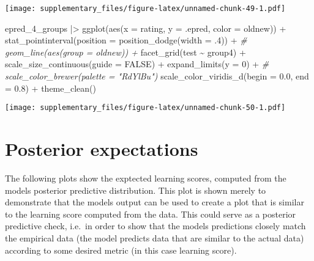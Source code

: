 \documentclass[
  man,floatsintext]{apa7}
\newenvironment{Shaded}{\begin{snugshade}}{\end{snugshade}}
\newcommand{\AttributeTok}[1]{\textcolor[rgb]{0.77,0.63,0.00}{#1}}
\newcommand{\CommentTok}[1]{\textcolor[rgb]{0.56,0.35,0.01}{\textit{#1}}}
\newcommand{\ConstantTok}[1]{\textcolor[rgb]{0.00,0.00,0.00}{#1}}
\newcommand{\DecValTok}[1]{\textcolor[rgb]{0.00,0.00,0.81}{#1}}
\newcommand{\FloatTok}[1]{\textcolor[rgb]{0.00,0.00,0.81}{#1}}
\newcommand{\FunctionTok}[1]{\textcolor[rgb]{0.00,0.00,0.00}{#1}}
\newcommand{\NormalTok}[1]{#1}
\newcommand{\SpecialCharTok}[1]{\textcolor[rgb]{0.00,0.00,0.00}{#1}}
\begin{document}
\texttt{[image: supplementary\_files/figure-latex/unnamed-chunk-49-1.pdf]}

\begin{Shaded}
\begin{Highlighting}[]
\NormalTok{epred\_4\_groups }\SpecialCharTok{|\textgreater{}}
  \FunctionTok{ggplot}\NormalTok{(}\FunctionTok{aes}\NormalTok{(}\AttributeTok{x =}\NormalTok{ rating, }\AttributeTok{y =}\NormalTok{ .epred, }\AttributeTok{color =}\NormalTok{ oldnew)) }\SpecialCharTok{+}
  \FunctionTok{stat\_pointinterval}\NormalTok{(}\AttributeTok{position =} \FunctionTok{position\_dodge}\NormalTok{(}\AttributeTok{width =}\NormalTok{ .}\DecValTok{4}\NormalTok{)) }\SpecialCharTok{+}
  \CommentTok{\# geom\_line(aes(group = oldnew)) +}
  \FunctionTok{facet\_grid}\NormalTok{(test }\SpecialCharTok{\textasciitilde{}}\NormalTok{ group4) }\SpecialCharTok{+}
  \FunctionTok{scale\_size\_continuous}\NormalTok{(}\AttributeTok{guide =} \ConstantTok{FALSE}\NormalTok{) }\SpecialCharTok{+}
  \FunctionTok{expand\_limits}\NormalTok{(}\AttributeTok{y =} \DecValTok{0}\NormalTok{) }\SpecialCharTok{+}  
  \CommentTok{\# scale\_color\_brewer(palette = "RdYlBu")}
  \FunctionTok{scale\_color\_viridis\_d}\NormalTok{(}\AttributeTok{begin =} \FloatTok{0.0}\NormalTok{, }\AttributeTok{end =} \FloatTok{0.8}\NormalTok{) }\SpecialCharTok{+}
  \FunctionTok{theme\_clean}\NormalTok{()}
\end{Highlighting}
\end{Shaded}

\texttt{[image: supplementary\_files/figure-latex/unnamed-chunk-50-1.pdf]}

\hypertarget{posterior-expectations}{%
\section{Posterior expectations}\label{posterior-expectations}}

The following plots show the exptected learning scores, computed from the models posterior predictive distribution. This plot is shown merely to demonstrate that the models output can be used to create a plot that is similar to the learning score computed from the data. This could serve as a posterior predictive check, i.e.~in order to show that the models predictions closely match the empirical data (the model predicts data that are similar to the actual data) according to some desired metric (in this case learning score).
\end{document}
